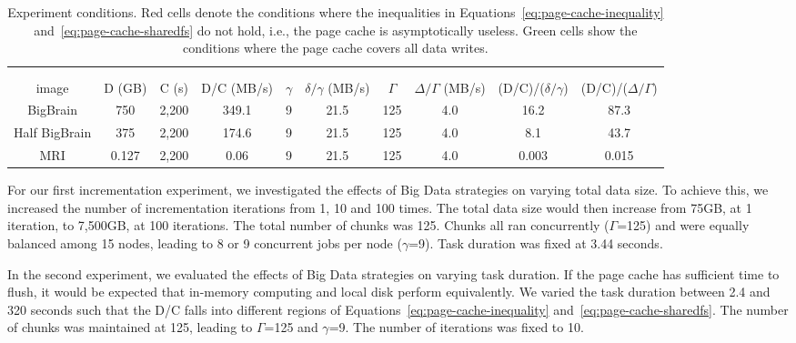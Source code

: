 \documentclass{IEEEtran}
\begin{document}
\begin{table*}
\begin{tabular}{c|ccc|cccc|cc}
\hline
  \multicolumn{10}{c}{}\\ 
 \rowcolor{headcolor}
  \multicolumn{10}{c}{Experiment 4: Image Size}\\
  \hline
  \rowcolor{headcolor}
 image  &
 D (GB) & C (s) & D/C (MB/s) &
 $\gamma$ & $\delta/\gamma$ (MB/s) & $\Gamma$ & $\Delta/\Gamma$ (MB/s)&
(D/C)/($\delta/\gamma$) & (D/C)/($\Delta/\Gamma$)\\
 \hline
 BigBrain      & 750   & 2,200   & 349.1     & 9  & 21.5  & 125 & 4.0 &  \cellcolor{red!20} 16.2 & \cellcolor{red!20} 87.3   \\
 Half BigBrain & 375   & 2,200   & 174.6     & 9  & 21.5  & 125 & 4.0 &  \cellcolor{red!20} 8.1 & \cellcolor{red!20} 43.7   \\
 MRI           & 0.127 & 2,200   & 0.06      & 9  & 21.5  & 125 & 4.0 &  \cellcolor{green!20} 0.003 & \cellcolor{green!20} 0.015  
\end{tabular}
\setlength{\belowcaptionskip}{-10pt}
\caption{Experiment conditions. Red cells denote the conditions where 
the inequalities in Equations~\ref{eq:page-cache-inequality} 
and~\ref{eq:page-cache-sharedfs} do not hold, i.e., the page cache is 
asymptotically useless. Green cells show the conditions where the page cache covers all data writes.}
\label{table:experiments}
\end{table*}

For our first incrementation experiment, we investigated the effects of 
Big Data strategies on varying total data size. To achieve this, we 
increased the number of incrementation iterations from 1, 10 and 100 
times. The total data size would then increase from 75GB, at 1 
iteration, to 7,500GB, at 100 iterations. The total number of chunks 
was 125. Chunks all ran concurrently ($\Gamma$=125) and were 
equally balanced among 15 nodes, leading to 8 or 9 concurrent jobs per 
node ($\gamma$=9). Task duration was fixed at 3.44 seconds.

In the second experiment, we evaluated the effects of Big Data 
strategies on varying task duration. If the page cache has sufficient 
time to flush, it would be expected that in-memory computing 
and local disk perform equivalently. We varied the task 
duration between 2.4 and 320 seconds such that the D/C falls into 
different regions of Equations~\ref{eq:page-cache-inequality} 
and~\ref{eq:page-cache-sharedfs}. The number of chunks was maintained 
at 125, leading to $\Gamma$=125 and $\gamma$=9. The number of iterations was
fixed to 10.
\end{document}
